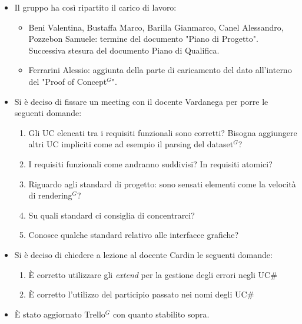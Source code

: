 \begin{itemize}
	\item Il gruppo ha così ripartito il carico di lavoro:
	\begin{itemize}
		\item Beni Valentina, Bustaffa Marco, Barilla Gianmarco, Canel Alessandro, Pozzebon Samuele: termine del documento "Piano di Progetto". Successiva stesura del documento Piano di Qualifica. 
		\item Ferrarini Alessio: aggiunta della parte di caricamento del dato all'interno del "Proof of Concept$^{G}$".
	\end{itemize}
	\item Si è deciso di fissare un meeting con il docente Vardanega per porre le seguenti domande:
	\begin{enumerate}
		\item Gli UC elencati tra i requisiti funzionali sono corretti? Bisogna aggiungere altri UC impliciti come ad esempio il parsing del dataset$^{G}$?
		\item I requisiti funzionali come andranno suddivisi? In requisiti atomici?
		\item Riguardo agli standard di progetto: sono sensati elementi come la velocità di rendering$^{G}$?
		\item Su quali standard ci consiglia di concentrarci?
		\item Conosce qualche standard relativo alle interfacce grafiche?
	\end{enumerate}
	\item Si è deciso di chiedere a lezione al docente Cardin le seguenti domande:
	\begin{enumerate}
		\item È corretto utilizzare gli \textit{extend} per la gestione degli errori negli UC\#
		\item È corretto l'utilizzo del participio passato nei nomi degli UC\#
	\end{enumerate}
	\item È stato aggiornato Trello$^{G}$ con quanto stabilito sopra.
\end{itemize}